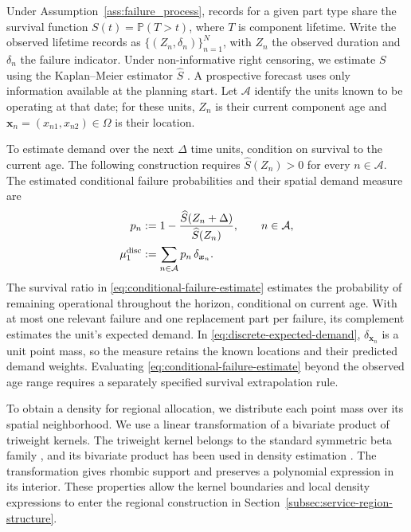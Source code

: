 \documentclass[a4paper,fleqn]{cas-sc}
\theoremstyle{remark}
\theoremstyle{plain}
\begin{document}
Under Assumption~\ref{ass:failure_process}, records for a given part type share the survival function $S(t)=\mathbb P(T>t)$, where $T$ is component lifetime. Write the observed lifetime records as $\{(Z_n,\delta_n)\}_{n=1}^N$, with $Z_n$ the observed duration and $\delta_n$ the failure indicator. Under non-informative right censoring, we estimate $S$ using the Kaplan--Meier estimator $\widehat S$ \citep{kaplan1958nonparametric}. A prospective forecast uses only information available at the planning start. Let $\mathcal A$ identify the units known to be operating at that date; for these units, $Z_n$ is their current component age and $\bm x_n=(x_{n1},x_{n2})\in\Omega$ is their location.

To estimate demand over the next $\Delta$ time units, condition on survival to the current age. The following construction requires $\widehat S(Z_n)>0$ for every $n\in\mathcal A$. The estimated conditional failure probabilities and their spatial demand measure are
\begin{subequations}\label{eq:predicted-point-demand}
\allowdisplaybreaks[0]
\begin{align}
    p_n&:=1-\frac{\widehat S(Z_n+\Delta)}{\widehat S(Z_n)},\qquad n\in\mathcal A,\label{eq:conditional-failure-estimate}\\
    \mu_1^{\mathrm{disc}}&:=\sum_{n\in\mathcal A}p_n\,\delta_{\bm x_n}.\label{eq:discrete-expected-demand}
\end{align}
\end{subequations}
The survival ratio in \eqref{eq:conditional-failure-estimate} estimates the probability of remaining operational throughout the horizon, conditional on current age. With at most one relevant failure and one replacement part per failure, its complement estimates the unit's expected demand. In \eqref{eq:discrete-expected-demand}, $\delta_{\bm x_n}$ is a unit point mass, so the measure retains the known locations and their predicted demand weights. Evaluating \eqref{eq:conditional-failure-estimate} beyond the observed age range requires a separately specified survival extrapolation rule.

To obtain a density for regional allocation, we distribute each point mass over its spatial neighborhood. We use a linear transformation of a bivariate product of triweight kernels. The triweight kernel belongs to the standard symmetric beta family \citep{langrene2019fast}, and its bivariate product has been used in density estimation \citep{li2002structural}. The transformation gives rhombic support and preserves a polynomial expression in its interior. These properties allow the kernel boundaries and local density expressions to enter the regional construction in Section~\ref{subsec:service-region-structure}.
\end{document}
